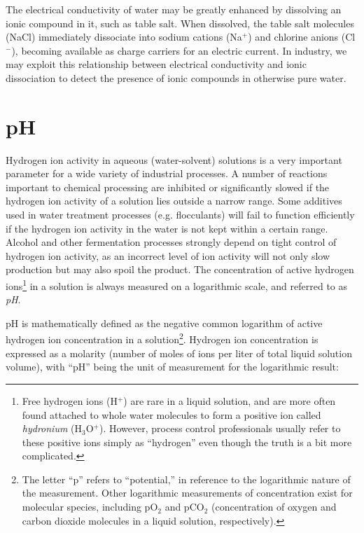 \vskip 10pt

The electrical conductivity of water may be greatly enhanced by dissolving an ionic compound in it, such as table salt.  When dissolved, the table salt molecules (NaCl) immediately dissociate into sodium cations (Na$^{+}$) and chlorine anions (Cl$^{-}$), becoming available as charge carriers for an electric current.  In industry, we may exploit this relationship between electrical conductivity and ionic dissociation to detect the presence of ionic compounds in otherwise pure water.











\filbreak
\section{pH}

Hydrogen ion activity in aqueous (water-solvent) solutions is a very important parameter for a wide variety of industrial processes.  A number of reactions important to chemical processing are inhibited or significantly slowed if the hydrogen ion activity of a solution lies outside a narrow range.  Some additives used in water treatment processes (e.g. flocculants) will fail to function efficiently if the hydrogen ion activity in the water is not kept within a certain range.  Alcohol and other fermentation processes strongly depend on tight control of hydrogen ion activity, as an incorrect level of ion activity will not only slow production but may also spoil the product.  The concentration of active hydrogen ions\footnote{Free hydrogen ions (H$^{+}$) are rare in a liquid solution, and are more often found attached to whole water molecules to form a positive ion called \textit{hydronium} (H$_{3}$O$^{+}$).  However, process control professionals usually refer to these positive ions simply as ``hydrogen'' even though the truth is a bit more complicated.} in a solution is always measured on a logarithmic scale, and referred to as \textit{pH}.     


\label{pH}

pH is mathematically defined as the negative common logarithm of active hydrogen ion concentration in a solution\footnote{The letter ``p'' refers to ``potential,'' in reference to the logarithmic nature of the measurement.  Other logarithmic measurements of concentration exist for molecular species, including pO$_{2}$ and pCO$_{2}$ (concentration of oxygen and carbon dioxide molecules in a liquid solution, respectively).}.  Hydrogen ion concentration is expressed as a molarity (number of moles of ions per liter of total liquid solution volume), with ``pH'' being the unit of measurement for the logarithmic result:  

